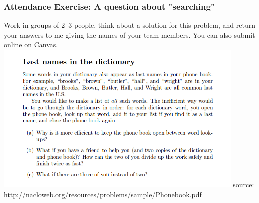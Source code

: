 \documentclass{beamer}
\begin{document}
%

\begin{frame} %
\frametitle{Attendance Exercise: A question about "searching"}
Work in groups of 2--3 people, think about a solution for this problem, and return your answers to me giving the names of your team members. You can also submit online on Canvas. 
\includegraphics[width=0.9\textwidth]{18Sep-120Exercise.png}
\tiny source: \url{http://nacloweb.org/resources/problems/sample/Phonebook.pdf}
\end{frame}
\end{document}
